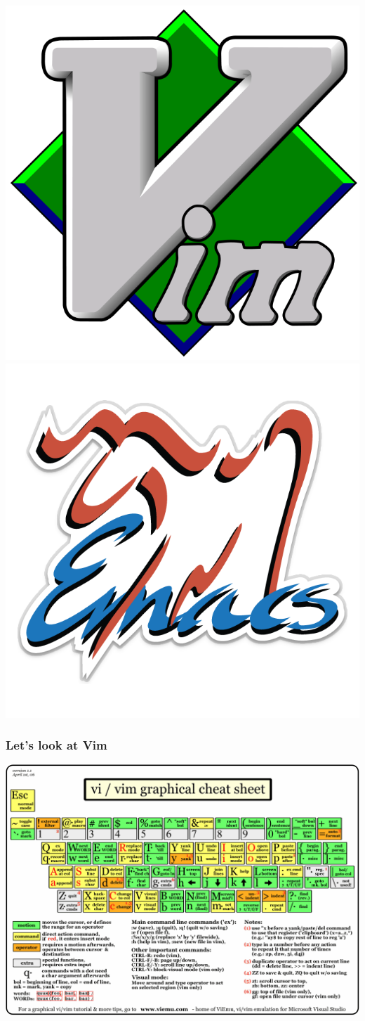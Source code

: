 \documentclass[8pt]{beamer}
\begin{document}
\begin{frame}
  \includegraphics[width=.5\textwidth]{vim_logo.png}
  \includegraphics[width=.5\textwidth]{emacs_logo.png}
\end{frame}

\begin{frame}
  \frametitle{Let's look at Vim}
  \includegraphics[width=\textwidth]{vim_cheatsheet.png}
\end{frame}
\end{document}
